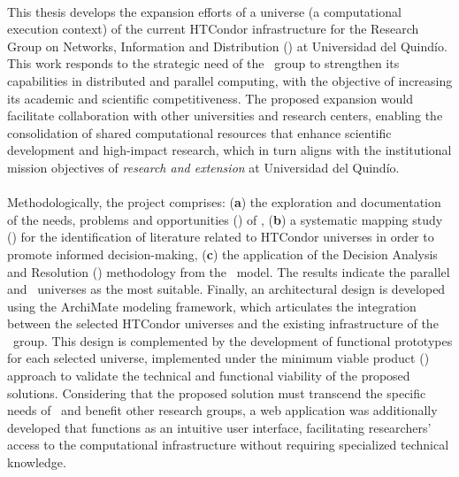 \label{cap:abstract}
\mbox{}\\

This thesis develops the expansion efforts of a universe (\ie a computational execution context) of the current HTCondor infrastructure for the Research Group on Networks, Information and Distribution (\GRID) at Universidad del Quindío. This work responds to the strategic need of the \GRID~group to strengthen its capabilities in distributed and parallel computing, with the objective of increasing its academic and scientific competitiveness. The proposed expansion would facilitate collaboration with other universities and research centers, enabling the consolidation of shared computational resources that enhance scientific development and high-impact research, which in turn aligns with the institutional mission objectives of \textit{research and extension} at Universidad del Quindío.
\\\\
Methodologically, the project comprises: (\textbf{a}) the exploration and documentation of the needs, problems and opportunities (\NPO) of \GRID, (\textbf{b}) a systematic mapping study (\SMS) for the identification of literature related to HTCondor universes in order to promote informed decision-making, (\textbf{c}) the application of the Decision Analysis and Resolution (\DAR) methodology from the \CMMI~model. The results indicate the parallel and \GRID~universes as the most suitable. Finally, an architectural design is developed using the ArchiMate modeling framework, which articulates the integration between the selected HTCondor universes and the existing infrastructure of the \GRID~group. This design is complemented by the development of functional prototypes for each selected universe, implemented under the minimum viable product (\PMV) approach to validate the technical and functional viability of the proposed solutions. Considering that the proposed solution must transcend the specific needs of \GRID~and benefit other research groups, a web application was additionally developed that functions as an intuitive user interface, facilitating researchers' access to the computational infrastructure without requiring specialized technical knowledge.